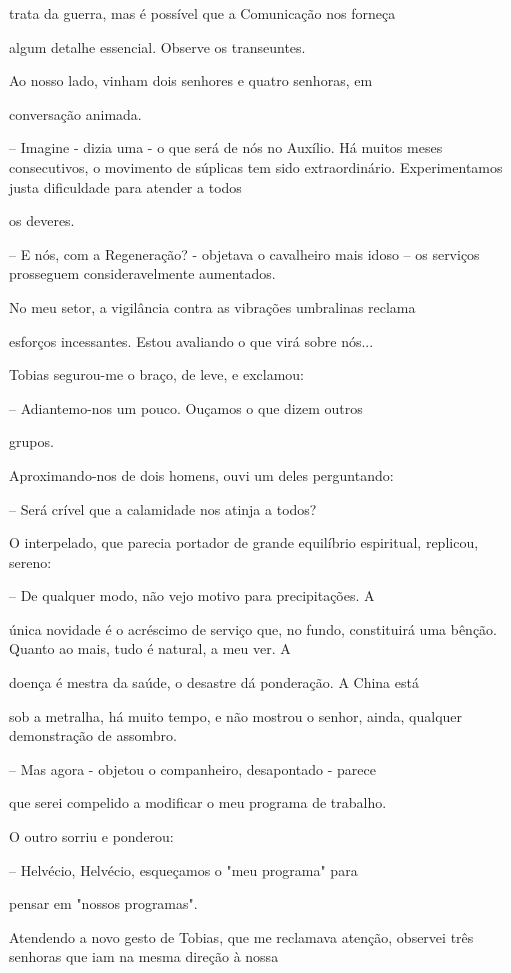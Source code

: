\documentclass[portuguese,12pt,a4paper]{scrbook}
\begin{document}
	trata da guerra, mas é possível que a Comunicação nos forneça
	
	algum detalhe essencial. Observe os transeuntes.
	
	Ao nosso lado, vinham dois senhores e quatro senhoras, em
	
	conversação animada.
	
	– Imagine - dizia uma - o que será de nós no Auxílio. Há muitos meses consecutivos, o movimento de súplicas tem sido extraordinário. Experimentamos justa dificuldade para atender a todos
	
	os deveres.
	
	– E nós, com a Regeneração? - objetava o cavalheiro mais idoso – os serviços prosseguem consideravelmente aumentados.
	
	No meu setor, a vigilância contra as vibrações umbralinas reclama
	
	esforços incessantes. Estou avaliando o que virá sobre nós...
	
	Tobias segurou-me o braço, de leve, e exclamou:
	
	– Adiantemo-nos um pouco. Ouçamos o que dizem outros
	
	grupos.
	
	Aproximando-nos de dois homens, ouvi um deles perguntando:
	
	– Será crível que a calamidade nos atinja a todos?
	
	O interpelado, que parecia portador de grande equilíbrio espiritual, replicou, sereno:
	
	– De qualquer modo, não vejo motivo para precipitações. A
	
	única novidade é o acréscimo de serviço que, no fundo, constituirá uma bênção. Quanto ao mais, tudo é natural, a meu ver. A
	
	doença é mestra da saúde, o desastre dá ponderação. A China está
	
	sob a metralha, há muito tempo, e não mostrou o senhor, ainda, qualquer demonstração de assombro.
	
	– Mas agora - objetou o companheiro, desapontado - parece
	
	que serei compelido a modificar o meu programa de trabalho.
	
	O outro sorriu e ponderou:
	
	– Helvécio, Helvécio, esqueçamos o "meu programa" para
	
	pensar em "nossos programas".
	
	Atendendo a novo gesto de Tobias, que me reclamava atenção, observei três senhoras que iam na mesma direção à nossa
	
\end{document}
